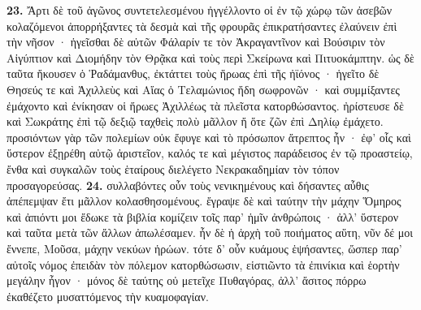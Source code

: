 \documentclass[a4paper, 11pt, oneside, polutonikogreek, german]{article}
\begin{document}
\textbf{23.} Ἄρτι δὲ τοῦ ἀγῶνος συντετελεσμένου ἠγγέλλοντο οἱ ἐν τῷ χώρῳ τῶν ἀσεβῶν κολαζόμενοι ἀπορρήξαντες τὰ δεσμὰ καὶ τῆς φρουρᾶς ἐπικρατήσαντες ἐλαύνειν ἐπὶ τὴν νῆσον · ἡγεῖσθαι δὲ αὐτῶν Φάλαρίν τε τὸν Ἀκραγαντῖνον καὶ Βούσιριν τὸν Αἰγύπτιον καὶ Διομήδην τὸν Θρᾷκα καὶ τοὺς περὶ Σκείρωνα καὶ Πιτυοκάμπτην. ὡς δὲ ταῦτα ἤκουσεν ὁ Ῥαδάμανθυς, ἐκτάττει τοὺς ἥρωας ἐπὶ τῆς ἠϊόνος · ἡγεῖτο δὲ Θησεύς τε καὶ Ἀχιλλεὺς καὶ Αἴας ὁ Τελαμώνιος ἤδη σωφρονῶν · καὶ συμμίξαντες ἐμάχοντο καὶ ἐνίκησαν οἱ ἥρωες Ἀχιλλέως τὰ πλεῖστα κατορθώσαντος. ἠρίστευσε δὲ καὶ Σωκράτης ἐπὶ τῷ δεξιῷ ταχθεὶς πολὺ μᾶλλον ἤ ὅτε ζῶν ἐπὶ Δηλίῳ ἐμάχετο. προσιόντων γὰρ τῶν πολεμίων οὐκ ἔφυγε καὶ τὸ πρόσωπον ἄτρεπτος ἦν · ἐφ' οἷς καὶ ὕστερον ἐξῃρέθη αὐτῷ ἀριστεῖον, καλός τε καὶ μέγιστος παράδεισος ἐν τῷ προαστείῳ, ἔνθα καὶ συγκαλῶν τοὺς ἑταίρους διελέγετο Νεκρακαδημίαν τὸν τόπον προσαγορεύσας. \textbf{24.} συλλαβόντες οὖν τοὺς νενικημένους καὶ δήσαντες αὖθις ἀπέπεμψαν ἔτι μᾶλλον κολασθησομένους. ἔγραψε δὲ καὶ ταύτην τὴν μάχην Ὅμηρος καὶ ἀπιόντι μοι ἔδωκε τὰ βιβλία κομίζειν τοῖς παρ' ἡμῖν ἀνθρώποις · ἀλλ' ὕστερον καὶ ταῦτα μετὰ τῶν ἄλλων ἀπωλέσαμεν. ἦν δὲ ἡ ἀρχὴ τοῦ ποιήματος αὕτη, νῦν δέ μοι ἔννεπε, Μοῦσα, μάχην νεκύων ἡρώων. τότε δ' οὖν κυάμους ἑψήσαντες, ὥσπερ παρ' αὐτοῖς νόμος ἐπειδὰν τὸν πόλεμον κατορθώσωσιν, εἱστιῶντο τὰ ἐπινίκια καὶ ἑορτὴν μεγάλην ἦγον · μόνος δὲ ταύτης οὐ μετεῖχε Πυθαγόρας, ἀλλ' ἄσιτος πόρρω ἐκαθέζετο μυσαττόμενος τὴν κυαμοφαγίαν.
\end{document}
